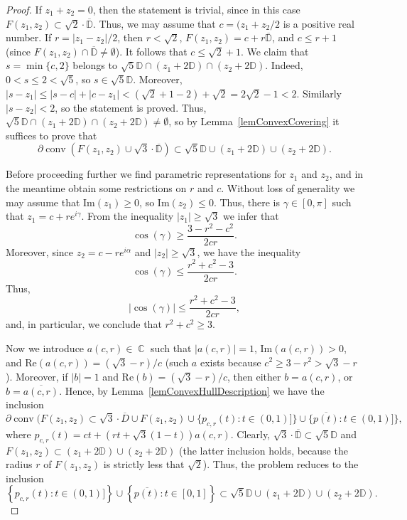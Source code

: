 \documentclass{amsart}
\numberwithin{equation}{section}
\theoremstyle{definition}
\theoremstyle{remark}
\DeclareMathOperator{\conv}{conv}
\DeclareMathOperator{\CC}{\mathbb C}
\begin{document}
	\begin{proof}
		If $z_1 + z_2 = 0$, then the statement is trivial, since in this case $F(z_1,z_2) \subset \sqrt{2}\cdot \overline{\mathbb D}$. Thus, we may assume that $c = (z_1 + z_2/2$ is a positive real number. If $r = |z_1 - z_2|/2$, then $r < \sqrt{2}$, $F(z_1,z_2) = c + r\overline{\mathbb D}$, and $c \le r + 1$ (since $F(z_1, z_2) \cap \overline{\mathbb D} \ne \emptyset$). It follows that $c \le \sqrt{2} + 1$. We claim that $s = \min\{c, 2\}$ belongs to $\sqrt{5}\mathbb D \cap (z_1 + 2\mathbb {D}) \cap (z_2 + 2\mathbb D)$. Indeed, $0 < s \le 2 < \sqrt{5}$, so $s \in \sqrt{5}\mathbb D$. Moreover, $|s - z_1| \le |s - c| + |c - z_1| < (\sqrt{2} + 1 - 2) + \sqrt{2} = 2\sqrt{2} - 1 < 2$. Similarly $|s - z_2| < 2$, so the statement is proved. Thus, $\sqrt{5}\mathbb D \cap (z_1 + 2\mathbb {D}) \cap (z_2 + 2\mathbb D) \ne \emptyset$, so by Lemma~\ref{lemConvexCovering} it suffices to prove that
		\[
		\partial \conv(F(z_1,z_2) \cup \sqrt{3}\cdot\overline{\mathbb D}) \subset \sqrt{5}\mathbb D \cup (z_1 + 2\mathbb D) \cup (z_2 + 2\mathbb D).
		\]
		
		Before proceeding further we find parametric representations for $z_1$ and $z_2$, and in the meantime obtain some restrictions on $r$ and $c$. Without loss of generality we may assume that $\mathrm{Im}(z_1) \ge 0$, so $\mathrm{Im}(z_2) \le 0$. Thus, there is $\gamma \in [0,\pi]$ such that $z_1 = c + re^{i\gamma}$. From the inequality $|z_1| \ge \sqrt{3}$ we infer that
		\[
		\cos(\gamma) \ge \dfrac{3 - r^2 - c^2}{2cr}.
		\]
		Moreover, since $z_2 = c - re^{i\alpha}$ and $|z_2| \ge \sqrt{3}$, we have the inequality
		\[
		\cos(\gamma) \le \dfrac{r^2 + c^2 - 3}{2cr}.
		\]
		Thus, 
		\[
		|\cos(\gamma)| \le \dfrac{r^2 + c^2 - 3}{2cr},
		\]
		and, in particular, we conclude that $r^2 + c^2 \ge 3$. 
		
		Now we introduce $a(c,r) \in \CC$ such that $|a(c,r)| = 1$, $\mathrm{Im}(a(c,r)) > 0$, and $\mathrm{Re}(a(c,r)) = (\sqrt{3} - r)/c$ (such $a$ exists because $c^2 \ge 3 - r^2 > \sqrt{3} - r$). Moreover, if $|b| = 1$ and $\mathrm{Re}(b) = (\sqrt{3} - r)/c$, then either $b = a(c,r)$, or $b = \overline{a(c,r)}$. Hence, by Lemma~\ref{lemConvexHullDescription} we have the inclusion
		\[
		\partial \conv(F(z_1,z_2) \subset \sqrt{3}\cdot \overline{D} \cup F(z_1, z_2) \cup \{p_{c,r}(t):t \in (0,1)]\} \cup \{\overline{p(t)}: t \in (0,1)]\},
		\]
		where $p_{c,r}(t) = ct + (rt + \sqrt{3}(1 - t))a(c,r)$. Clearly, $\sqrt{3}\cdot \overline{\mathbb D} \subset \sqrt{5}\mathbb D$ and $F(z_1, z_2) \subset (z_1 + 2\mathbb D) \cup (z_2 + 2\mathbb D)$ (the latter inclusion holds, because the radius $r$ of $F(z_1,z_2)$ is strictly less that $\sqrt{2}$). Thus, the problem reduces to the inclusion
		\begin{equation}\label{eqBoundaryReduction}
			\left\{p_{c,r}(t):t \in (0,1)]\right\} \cup \left\{\overline{p(t)}: t \in [0,1]\right\} \subset \sqrt{5}\mathbb D \cup (z_1 + 2\mathbb D) \cup (z_2 + 2\mathbb D).
		\end{equation}
		

\end{proof}
\end{document}
